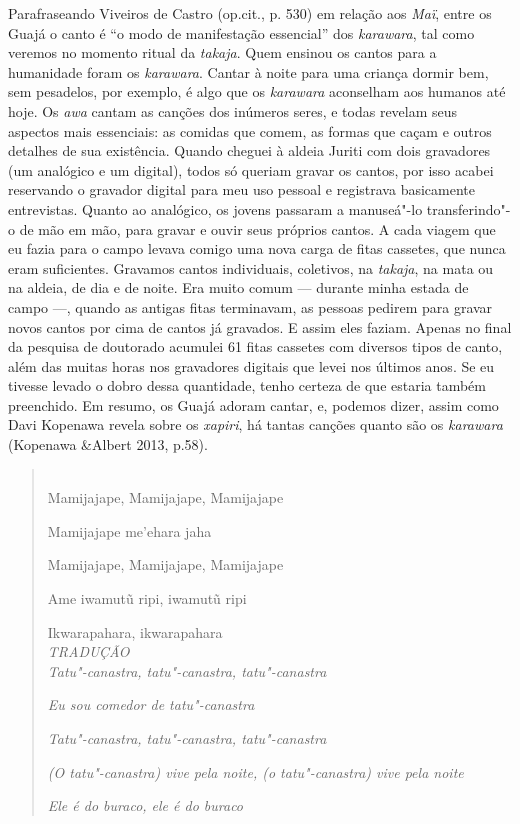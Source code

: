 Parafraseando Viveiros de Castro (op.cit., p. 530) em relação aos
\emph{Maï}, entre os Guajá o canto é ``o modo de manifestação essencial''
dos \emph{karawara}, tal como veremos no momento ritual da
\emph{takaja}. Quem ensinou os cantos para a humanidade foram os
\emph{karawara}. Cantar à noite para uma criança dormir bem, sem
pesadelos, por exemplo, é algo que os \emph{karawara} aconselham aos
humanos até hoje. Os \emph{awa} cantam as canções dos inúmeros seres, e
todas revelam seus aspectos mais essenciais: as comidas que comem, as
formas que caçam e outros detalhes de sua existência. Quando cheguei à
aldeia Juriti com dois gravadores (um analógico e um digital), todos só
queriam gravar os cantos, por isso acabei reservando o gravador digital
para meu uso pessoal e registrava basicamente entrevistas. Quanto ao
analógico, os jovens passaram a manuseá"-lo transferindo"-o de mão em mão,
para gravar e ouvir seus próprios cantos. A cada viagem que eu fazia
para o campo levava comigo uma nova carga de fitas cassetes, que nunca
eram suficientes. Gravamos cantos individuais, coletivos, na
\emph{takaja}, na mata ou na aldeia, de dia e de noite. Era muito comum
--- durante minha estada de campo ---, quando as antigas fitas terminavam,
as pessoas pedirem para gravar novos cantos por cima de cantos já
gravados. E assim eles faziam. Apenas no final da pesquisa de doutorado
acumulei 61 fitas cassetes com diversos tipos de canto, além das muitas
horas nos gravadores digitais que levei nos últimos anos. Se eu tivesse
levado o dobro dessa quantidade, tenho certeza de que estaria também
preenchido. Em resumo, os Guajá adoram cantar, e, podemos dizer, assim
como Davi Kopenawa revela sobre os \emph{xapiri}, há tantas canções
quanto são os \emph{karawara} (Kopenawa \&Albert 2013, p.58).

\pagebreak
\begin{quote}
\forceindent
{} \\

Mamijajape, Mamijajape, Mamijajape

Mamijajape me'ehara jaha

Mamijajape, Mamijajape, Mamijajape

Ame iwamutũ ripi, iwamutũ ripi 

Ikwarapahara, ikwarapahara\\

\emph{TRADUÇÃO}\\

\emph{Tatu"-canastra, tatu"-canastra, tatu"-canastra}

\emph{Eu sou comedor de tatu"-canastra}

\emph{Tatu"-canastra, tatu"-canastra, tatu"-canastra}

\emph{(O tatu"-canastra) vive pela noite, (o tatu"-canastra) vive pela noite}

\emph{Ele é do buraco, ele é do buraco}
\end{quote}


